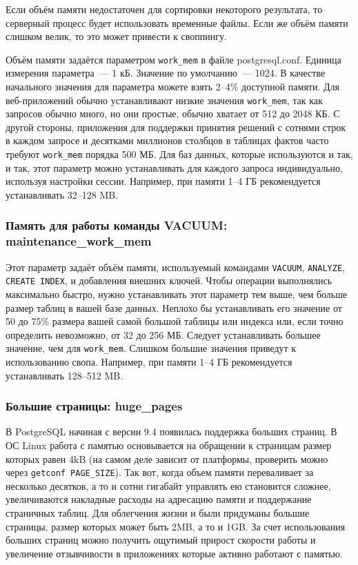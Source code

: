 Если объём памяти недостаточен для сортировки некоторого результата, то серверный процесс будет использовать временные файлы. Если же объём памяти слишком велик, то это может привести к своппингу.

Объём памяти задаётся параметром \lstinline!work_mem! в файле postgresql.conf. Единица измерения параметра~--- 1 кБ. Значение по умолчанию~--- 1024. В качестве начального значения для параметра можете взять 2--4\% доступной памяти. Для веб-приложений обычно устанавливают низкие значения \lstinline!work_mem!, так как запросов обычно много, но они простые, обычно хватает от 512 до 2048 КБ. С другой стороны, приложения для поддержки принятия решений с сотнями строк в каждом запросе и десятками миллионов столбцов в таблицах фактов часто требуют \lstinline!work_mem! порядка 500 МБ. Для баз данных, которые используются и так, и так, этот параметр можно устанавливать для каждого запроса индивидуально, используя настройки сессии. Например, при памяти 1--4 ГБ рекомендуется устанавливать 32--128 MB.


\subsubsection{Память для работы команды VACUUM: maintenance\_work\_mem}


Этот параметр задаёт объём памяти, используемый командами \lstinline!VACUUM!, \lstinline!ANALYZE!, \lstinline!CREATE INDEX!, и добавления внешних ключей. Чтобы операции выполнялись максимально быстро, нужно устанавливать этот параметр тем выше, чем больше размер таблиц в вашей базе данных. Неплохо бы устанавливать его значение от 50 до 75\% размера вашей самой большой таблицы или индекса или, если точно определить невозможно, от 32 до 256 МБ. Следует устанавливать большее значение, чем для \lstinline!work_mem!. Слишком большие значения приведут к использованию свопа. Например, при памяти 1--4 ГБ рекомендуется устанавливать 128--512 MB.


\subsubsection{Большие страницы: huge\_pages}


В PostgreSQL начиная с версии 9.4 появилась поддержка больших страниц. В ОС Linux работа с памятью основывается на обращении к страницам размер которых равен 4kB (на самом деле зависит от платформы, проверить можно через \lstinline!getconf PAGE_SIZE!). Так вот, когда объем памяти переваливает за несколько десятков, а то и сотни гигабайт управлять ею становится сложнее, увеличиваются накладные расходы на адресацию памяти и поддержание страничных таблиц. Для облегчения жизни и были придуманы большие страницы, размер которых может быть 2MB, а то и 1GB. За счет использования больших страниц можно получить ощутимый прирост скорости работы и увеличение отзывчивости в приложениях которые активно работают с памятью.

